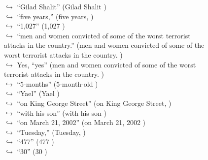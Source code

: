 \documentclass[11pt,a4paper, onecolumn]{article}
\begin{document}
\begin{figure}[t] \small \begin{tcolorbox}[boxsep=0pt,left=5pt,right=0pt,top=2pt,colback = yellow!5] \begin{dialogue}
 \small 
\colorbox{pink!25}{$\hookrightarrow$}
{ ``Gilad Shalit'' (Gilad Shalit ) }
\\
\colorbox{pink!25}{$\hookrightarrow$}
{ ``five years,'' (five years, ) }
\\
\colorbox{pink!25}{$\hookrightarrow$}
{ ``1,027'' (1,027 ) }
\\
\colorbox{pink!25}{$\hookrightarrow$}
{ ``men and women convicted of some of the worst terrorist attacks in the country.'' (men and women convicted of some of the worst terrorist attacks in the country. ) }
\\
\colorbox{pink!25}{$\hookrightarrow$}
\colorbox{red!25}{Yes,}
{ ``yes'' (men and women convicted of some of the worst terrorist attacks in the country. ) }
\\
\colorbox{pink!25}{$\hookrightarrow$}
{ ``5-months'' (5-month-old ) }
\\
\colorbox{pink!25}{$\hookrightarrow$}
{ ``Yael'' (Yael ) }
\\
\colorbox{pink!25}{$\hookrightarrow$}
{ ``on King George Street'' (on King George Street, ) }
\\
\colorbox{pink!25}{$\hookrightarrow$}
{ ``with his son'' (with his son ) }
\\
\colorbox{pink!25}{$\hookrightarrow$}
{ ``on March 21, 2002'' (on March 21, 2002 ) }
\\
\colorbox{pink!25}{$\hookrightarrow$}
{ ``Tuesday,'' (Tuesday, ) }
\\
\colorbox{pink!25}{$\hookrightarrow$}
{ ``477'' (477 ) }
\\
\colorbox{pink!25}{$\hookrightarrow$}
{ ``30'' (30 ) }
\\
 \end{dialogue}\end{tcolorbox}\end{figure}
\end{document}
